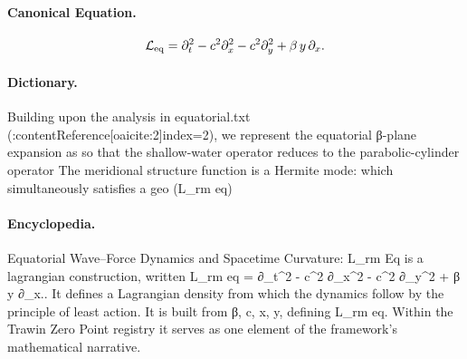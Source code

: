 \paragraph{Canonical Equation.}
\[
\mathcal{L}_{\rm eq} = \partial_t^2 - c^2 \partial_x^2 - c^2 \partial_y^2 + \beta\,y\,\partial_x.
\]

\paragraph{Dictionary.}
Building upon the analysis in equatorial.txt (:contentReference[oaicite:2]index=2), we represent the equatorial β-plane expansion as so that the shallow-water operator reduces to the parabolic-cylinder operator The meridional structure function is a Hermite mode: which simultaneously satisfies a geo (L\_rm eq)

\paragraph{Encyclopedia.}
Equatorial Wave–Force Dynamics and Spacetime Curvature: L\_rm Eq is a lagrangian construction, written L\_rm eq = ∂\_t\textasciicircum{}2 - c\textasciicircum{}2 ∂\_x\textasciicircum{}2 - c\textasciicircum{}2 ∂\_y\textasciicircum{}2 + β y ∂\_x.. It defines a Lagrangian density from which the dynamics follow by the principle of least action. It is built from β, c, x, y, defining L\_rm eq. Within the Trawin Zero Point registry it serves as one element of the framework's mathematical narrative.
